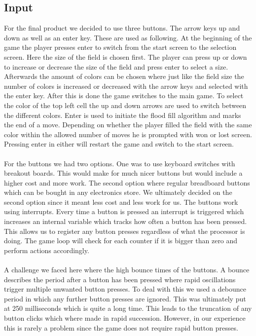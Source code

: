 \documentclass[12pt, a4paper]{article}
\begin{document}
\subsection*{Input}
For the final product we decided to use three buttons. The arrow keys up and down as well as an enter key. These are used as following. At the beginning of the game the player presses enter to switch from the start screen to the selection screen. Here the size of the field is chosen first. The player can press up or down to increase or decrease the size of the field and press enter to select a size. Afterwards the amount of colors can be chosen where just like the field size the number of colors is increased or decreased with the arrow keys and selected with the enter key. After this is done the game switches to the main game. To select the color of the top left cell the up and down arrows are used to switch between the different colors. Enter is used to initiate the flood fill algorithm and marks the end of a move. Depending on whether the player filled the field with the same color within the allowed number of moves he is prompted with won or lost screen. Pressing enter in either will restart the game and switch to the start screen.\\\\
For the buttons we had two options. One was to use keyboard switches with breakout boards. This would make for much nicer buttons but would include a higher cost and more work. The second option where regular breadboard buttons which can be bought in any electronics store. We ultimately decided on the second option since it meant less cost and less work for us. The buttons work using interrupts. Every time a button is pressed an interrupt is triggered which increases an internal variable which tracks how often a button has been pressed. This allows us to register any button presses regardless of what the processor is doing. The game loop will check for each counter if it is bigger than zero and perform actions accordingly.\\\\
A challenge we faced here where the high bounce times of the buttons. A bounce describes the period after a button has been pressed where rapid oscillations trigger multiple unwanted button presses. To deal with this we used a debounce period in which any further button presses are ignored. This was ultimately put at 250 milliseconds which is quite a long time. This leads to the truncation of any button clicks which where made in rapid succession. However, in our experience this is rarely a problem since the game does not require rapid button presses. 
\end{document}
